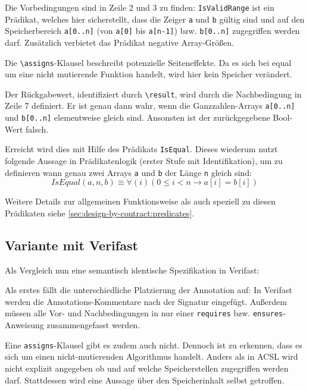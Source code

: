 
Die Vorbedingungen sind in Zeile 2 und 3 zu finden: \lstinline{IsValidRange} ist ein Prädikat, welches hier sicherstellt,
dass die Zeiger \lstinline{a} und \lstinline{b} gültig sind und auf den Speicherbereich \lstinline{a[0..n]} 
(von \lstinline{a[0]} bis \lstinline{a[n-1]}) bzw. \lstinline{b[0..n]} zugegriffen 
werden darf. Zusätzlich verbietet das Prädikat negative Array-Größen.

Die \lstinline{\assigns}-Klausel beschreibt potenzielle Seiteneffekte. Da es sich bei equal um eine nicht mutierende
Funktion handelt, wird hier kein Speicher verändert.

Der Rückgabewert, identifiziert durch \lstinline{\result}, wird durch die Nachbedingung in Zeile 7 definiert. Er ist genau dann
wahr, wenn die Ganzzahlen-Arrays \lstinline{a[0..n]} und \lstinline{b[0..n]} elementweise gleich sind. Ansonsten ist der 
zurückgegebene Bool-Wert falsch. 

Erreicht wird dies mit Hilfe des Prädikats \lstinline{IsEqual}. Dieses wiederum
nutzt folgende Aussage in Prädikatenlogik (erster Stufe mit Identifikation), um zu definieren wann genau 
zwei Arrays \lstinline{a} und \lstinline{b} der Länge \lstinline{n} gleich sind:
\[IsEqual(a, n, b) \equiv \forall(i) (0 \leq i < n \rightarrow a[i] = b[i])\]

Weitere Details zur allgemeinen Funktionsweise als auch speziell zu diesen Prädikaten siehe
\ref{sec:design-by-contract:predicates}.



\subsection{Variante mit Verifast}
\label{sec:design-by-contract:verifast-variante}

Als Vergleich nun eine semantisch identische Spezifikation in Verifast:



Als erstes fällt die unterschiedliche Platzierung der Annotation auf: In Verifast werden die 
Annotations-Kommentare nach der Signatur eingefügt. Außerdem müssen alle Vor- und Nachbedingungen
in nur einer \lstinline{requires} bzw. \lstinline{ensures}-Anweisung zusammengefasst werden.

Eine \lstinline{assigns}-Klausel gibt es zudem auch nicht. Dennoch ist zu erkennen, dass es sich um einen 
nicht-mutierenden Algorithmus handelt. Anders als in ACSL wird nicht explizit angegeben ob und auf welche 
Speicherstellen zugegriffen werden darf. Stattdessen wird eine Aussage über den Speicherinhalt selbst getroffen.

